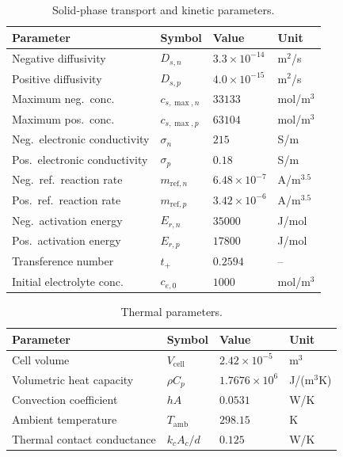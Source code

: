 \begin{table}[H]
\centering
\caption{Solid-phase transport and kinetic parameters.}
\label{tab:params_solid}
\begin{tabular}{llll}
\toprule
\textbf{Parameter} & \textbf{Symbol} & \textbf{Value} & \textbf{Unit} \\
\midrule
Negative diffusivity & $D_{s,n}$ & $3.3\times10^{-14}$ & m$^2$/s \\
Positive diffusivity & $D_{s,p}$ & $4.0\times10^{-15}$ & m$^2$/s \\
Maximum neg.\ conc. & $c_{s,\max,n}$ & $33133$ & mol/m$^3$ \\
Maximum pos.\ conc. & $c_{s,\max,p}$ & $63104$ & mol/m$^3$ \\
Neg.\ electronic conductivity & $\sigma_n$ & $215$ & S/m \\
Pos.\ electronic conductivity & $\sigma_p$ & $0.18$ & S/m \\
Neg.\ ref.\ reaction rate & $m_{\text{ref},n}$ & $6.48\times10^{-7}$ & A/m$^{3.5}$ \\
Pos.\ ref.\ reaction rate & $m_{\text{ref},p}$ & $3.42\times10^{-6}$ & A/m$^{3.5}$ \\
Neg.\ activation energy & $E_{r,n}$ & $35000$ & J/mol \\
Pos.\ activation energy & $E_{r,p}$ & $17800$ & J/mol \\
Transference number & $t_+$ & $0.2594$ & -- \\
Initial electrolyte conc. & $c_{e,0}$ & $1000$ & mol/m$^3$ \\
\bottomrule
\end{tabular}
\end{table}

\begin{table}[H]
\centering
\caption{Thermal parameters.}
\label{tab:params_thermal}
\begin{tabular}{llll}
\toprule
\textbf{Parameter} & \textbf{Symbol} & \textbf{Value} & \textbf{Unit} \\
\midrule
Cell volume & $V_\text{cell}$ & $2.42\times10^{-5}$ & m$^3$ \\
Volumetric heat capacity & $\rho C_p$ & $1.7676\times10^6$ & J/(m$^3$K) \\
Convection coefficient & $hA$ & $0.0531$ & W/K \\
Ambient temperature & $T_\text{amb}$ & $298.15$ & K \\
Thermal contact conductance & $k_c A_c / d$ & $0.125$ & W/K \\
\bottomrule
\end{tabular}
\end{table}

